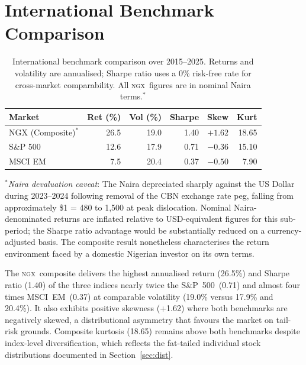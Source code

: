 \documentclass[twoside,11pt]{article}
\newcommand{\ngx}{\textsc{ngx}}
\newcommand{\spidx}{S\&P~500}
\newcommand{\msciem}{MSCI~EM}
\begin{document}
	\section{International Benchmark Comparison}
	\label{sec:comparison}
	\vspace{-20pt}
	\begin{table}[ht]
		\centering
		\caption{International benchmark comparison over 2015--2025.	Returns and volatility are annualised; Sharpe ratio uses a 0\% risk-free rate for cross-market comparability.	All \ngx\ figures are in nominal Naira terms.$^*$}
		\label{tab:comparison}
		\small
		\begin{tabular}{lrrrrr}
			\toprule
			\textbf{Market} & \textbf{Ret (\%)} & \textbf{Vol (\%)} &
			\textbf{Sharpe} & \textbf{Skew} & \textbf{Kurt}\\
			\midrule
			NGX (Composite)$^*$ & 26.5 & 19.0 & 1.40 & $+1.62$ & 18.65\\
			S\&P 500            & 12.6 & 17.9 & 0.71 & $-0.36$ & 15.10\\
			MSCI EM             &  7.5 & 20.4 & 0.37 & $-0.50$ &  7.90\\
			\bottomrule
		\end{tabular}
		\begin{minipage}{0.96\linewidth}
			\small\vspace{4pt}
			$^*$\textit{Naira devaluation caveat}: The Naira depreciated	sharply against the US Dollar during 2023--2024 following	removal of the CBN exchange rate peg, falling from approximately \$1 = \textsterling{}480 to	\textsterling{}1,500 at peak dislocation. Nominal Naira-denominated returns are inflated relative to USD-equivalent figures for this sub-period; the Sharpe ratio
			advantage would be substantially reduced on a
			currency-adjusted basis. The composite result nonetheless	characterises the return environment faced by a domestic Nigerian investor on its own terms.
		\end{minipage}
	\end{table}
	
	The \ngx\ composite delivers the highest annualised return (26.5\%)	and Sharpe ratio (1.40) of the three indices nearly twice the \spidx\ (0.71) and almost four times \msciem\ (0.37) at comparable volatility (19.0\% versus 17.9\% and 20.4\%). It also exhibits positive skewness (+1.62) where both benchmarks are negatively skewed, a distributional asymmetry that favours the
	market on tail-risk grounds. Composite kurtosis (18.65) remains	above both benchmarks despite index-level diversification, which reflects the fat-tailed individual stock distributions documented in Section~\ref{sec:dist}.
	
\end{document}
